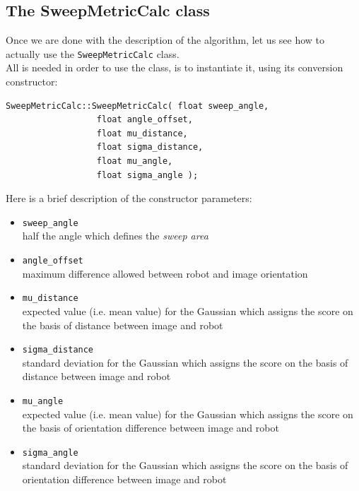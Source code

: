 \subsection{The SweepMetricCalc class}
\label{concr:iimageselector:sweep_metric_class}

Once we are done with the description of the algorithm, 
let us see how to actually use the \texttt{SweepMetricCalc} 
class. 
\\
All is needed in order to use the class, is to instantiate it,
using its conversion constructor:
\\
\begin{lstlisting}[caption={\texttt{SweepMetricCalc} class declaration},
    label={code:sweepmetriccalc}]
SweepMetricCalc::SweepMetricCalc( float sweep_angle,
				  float angle_offset,
				  float mu_distance,
				  float sigma_distance,
				  float mu_angle,
				  float sigma_angle );				  
\end{lstlisting}

Here is a brief description of the constructor parameters:

\begin{itemize}
  \item \texttt{sweep\_angle} \\
    half the angle which defines the \textit{sweep area}
  \item \texttt{angle\_offset} \\
    maximum difference allowed between robot and 
    image orientation 
  \item \texttt{mu\_distance} \\
    expected value (i.e. mean value) for the Gaussian 
    which assigns the score on the basis of distance between
    image and robot
  \item \texttt{sigma\_distance} \\
    standard deviation for the Gaussian which assigns the 
    score on the basis of distance between image and robot
  \item \texttt{mu\_angle} \\
    expected value (i.e. mean value) for the Gaussian which 
    assigns the score on the basis of orientation difference
    between image and robot
  \item \texttt{sigma\_angle} \\
    standard deviation for the Gaussian which assigns the 
    score on the basis of orientation difference between image
    and robot
\end{itemize}


